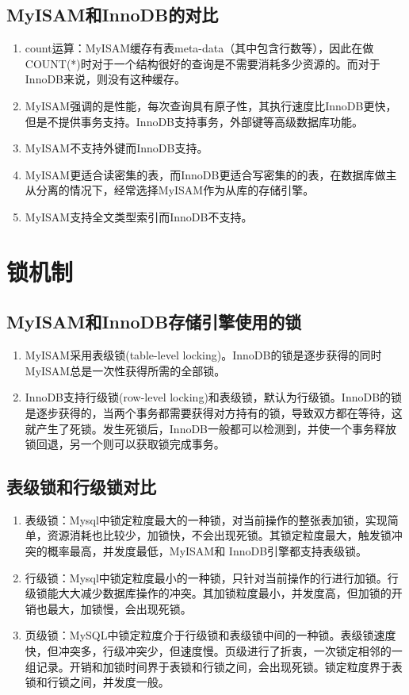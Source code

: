 \subsection{MyISAM和InnoDB的对比}
\begin{enumerate}
    \item count运算：MyISAM缓存有表meta-data（其中包含行数等），因此在做COUNT(*)时对于一个结构很好的查询是不需要消耗多少资源的。而对于InnoDB来说，则没有这种缓存。
    \item MyISAM强调的是性能，每次查询具有原子性，其执行速度比InnoDB更快，但是不提供事务支持。InnoDB支持事务，外部键等高级数据库功能。
    \item MyISAM不支持外键而InnoDB支持。
    \item MyISAM更适合读密集的表，而InnoDB更适合写密集的的表，在数据库做主从分离的情况下，经常选择MyISAM作为从库的存储引擎。
    \item MyISAM支持全文类型索引而InnoDB不支持。
\end{enumerate}

\section{锁机制}
\subsection{MyISAM和InnoDB存储引擎使用的锁}
\begin{enumerate}
    \item MyISAM采用表级锁(table-level locking)。InnoDB的锁是逐步获得的同时MyISAM总是一次性获得所需的全部锁。
    \item InnoDB支持行级锁(row-level locking)和表级锁，默认为行级锁。InnoDB的锁是逐步获得的，当两个事务都需要获得对方持有的锁，导致双方都在等待，这就产生了死锁。发生死锁后，InnoDB一般都可以检测到，并使一个事务释放锁回退，另一个则可以获取锁完成事务。
\end{enumerate}

\subsection{表级锁和行级锁对比}
\begin{enumerate}
    \item 表级锁：Mysql中锁定粒度最大的一种锁，对当前操作的整张表加锁，实现简单，资源消耗也比较少，加锁快，不会出现死锁。其锁定粒度最大，触发锁冲突的概率最高，并发度最低，MyISAM和 InnoDB引擎都支持表级锁。
    \item 行级锁：Mysql中锁定粒度最小的一种锁，只针对当前操作的行进行加锁。行级锁能大大减少数据库操作的冲突。其加锁粒度最小，并发度高，但加锁的开销也最大，加锁慢，会出现死锁。
    \item 页级锁：MySQL中锁定粒度介于行级锁和表级锁中间的一种锁。表级锁速度快，但冲突多，行级冲突少，但速度慢。页级进行了折衷，一次锁定相邻的一组记录。开销和加锁时间界于表锁和行锁之间，会出现死锁。锁定粒度界于表锁和行锁之间，并发度一般。
\end{enumerate}

